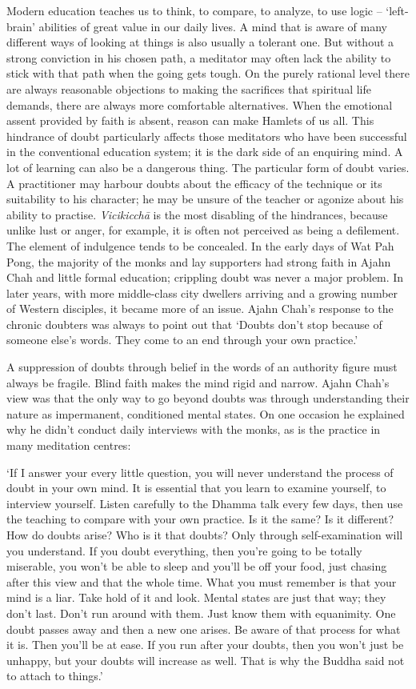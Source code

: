 Modern education teaches us to think, to compare, to analyze, to use
logic -- `left-brain' abilities of great value in our daily lives. A
mind that is aware of many different ways of looking at things is also
usually a tolerant one. But without a strong conviction in his chosen
path, a meditator may often lack the ability to stick with that path
when the going gets tough. On the purely rational level there are always
reasonable objections to making the sacrifices that spiritual life
demands, there are always more comfortable alternatives. When the
emotional assent provided by faith is absent, reason can make Hamlets of
us all. This hindrance of doubt particularly affects those meditators
who have been successful in the conventional education system; it is the
dark side of an enquiring mind. A lot of learning can also be a
dangerous thing. The particular form of doubt varies. A practitioner may
harbour doubts about the efficacy of the technique or its suitability to
his character; he may be unsure of the teacher or agonize about his
ability to practise. \emph{Vicikicchā} is the most disabling of the
hindrances, because unlike lust or anger, for example, it is often not
perceived as being a defilement. The element of indulgence tends to be
concealed. In the early days of Wat Pah Pong, the majority of the monks
and lay supporters had strong faith in Ajahn Chah and little formal
education; crippling doubt was never a major problem. In later years,
with more middle-class city dwellers arriving and a growing number of
Western disciples, it became more of an issue. Ajahn Chah's response to
the chronic doubters was always to point out that `Doubts don't stop
because of someone else's words. They come to an end through your own
practice.'

A suppression of doubts through belief in the words of an authority
figure must always be fragile. Blind faith makes the mind rigid and
narrow. Ajahn Chah's view was that the only way to go beyond doubts was
through understanding their nature as impermanent, conditioned mental
states. On one occasion he explained why he didn't conduct daily
interviews with the monks, as is the practice in many meditation
centres:

`If I answer your every little question, you will never understand the
process of doubt in your own mind. It is essential that you learn to
examine yourself, to interview yourself. Listen carefully to the Dhamma
talk every few days, then use the teaching to compare with your own
practice. Is it the same? Is it different? How do doubts arise? Who is
it that doubts? Only through self-examination will you understand. If
you doubt everything, then you're going to be totally miserable, you
won't be able to sleep and you'll be off your food, just chasing after
this view and that the whole time. What you must remember is that your
mind is a liar. Take hold of it and look. Mental states are just that
way; they don't last. Don't run around with them. Just know them with
equanimity. One doubt passes away and then a new one arises. Be aware of
that process for what it is. Then you'll be at ease. If you run after
your doubts, then you won't just be unhappy, but your doubts will
increase as well. That is why the Buddha said not to attach to things.'

